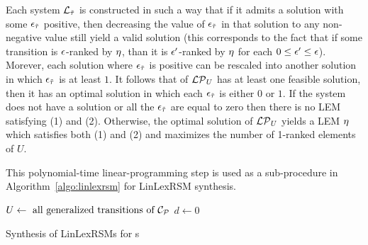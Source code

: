 Each system $\mathcal{L}_{\tilde{\tau}}$ is constructed in such a way that if it admits a solution with some $\epsilon_{\tilde{\tau}}$ positive, then decreasing the value of $\epsilon_{\tilde{\tau}}$ in that solution to any non-negative value still yield a valid solution (this corresponds to the fact that if some transition is $\epsilon$-ranked by $\eta$, than it is $\epsilon'$-ranked by $\eta$ for each $0\leq \epsilon'\leq \epsilon$). Morever, each solution where $\epsilon_{\tilde{\tau}}$ is positive can be rescaled into another solution in which $\epsilon_{\tilde{\tau}}$ is at least $1$. It follows that of $\mathcal{LP}_{U}$ has at least one feasible solution, then it has an optimal solution in which each $\epsilon_{\tilde{\tau}}$ is either $0$ or $1$. If the system does not have a solution or all the $\epsilon_{\tilde{\tau}}$ are equal to zero then there is no LEM satisfying (1) and (2). Otherwise, the optimal solution of $\mathcal{LP}_{U}$ yields a LEM $\eta$ which satisfies both (1) and (2) and maximizes the number of 1-ranked elements of $U$.

This polynomial-time linear-programming step is used as a sub-procedure in Algorithm~\ref{algo:linlexrsm} for LinLexRSM synthesis. 

\begin{algorithm}
\DontPrintSemicolon

$U \leftarrow \text{ all generalized transitions of } \mathcal{C}_{\mathcal{P}}$\;
$d\leftarrow 0$\;
\caption{Synthesis of LinLexRSMs for \APP{} s}
\label{algo:linlexrsm}
\end{algorithm}

